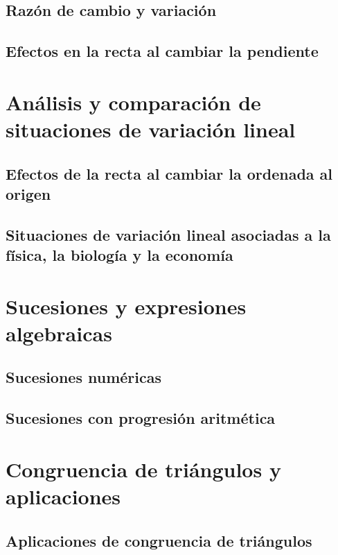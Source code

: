\documentclass[11pt]{book}
\begin{document}
\subsection{Razón de cambio y variación}

\subsection{Efectos en la recta al cambiar la pendiente}

\newpage \thispagestyle{plain}

\section{Análisis y comparación de situaciones de variación lineal}

\subsection{Efectos de la recta al cambiar la ordenada al origen}

\subsection{Situaciones de variación lineal asociadas a la física, la biología y la economía}

\newpage \thispagestyle{plain}

\section{Sucesiones y expresiones algebraicas}

\subsection{Sucesiones numéricas}

\subsection{Sucesiones con progresión aritmética}


\newpage \thispagestyle{plain}

\section{Congruencia de triángulos y aplicaciones}

\subsection{Aplicaciones de congruencia de triángulos}
\end{document}
